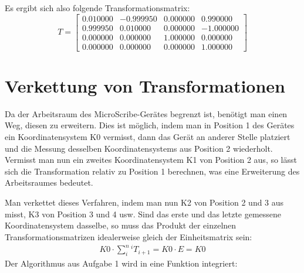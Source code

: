 \documentclass[11pt, a4paper]{article}
\begin{document}
Es ergibt sich also folgende Transformationsmatrix:
\begin{equation*}
T = \begin{bmatrix}
0.010000    &    -0.999950   &    0.000000    &    0.990000 \\
0.999950    &    0.010000    &    0.000000    &    -1.000000 \\
0.000000    &    0.000000    &    1.000000    &    0.000000 \\
0.000000    &    0.000000    &    0.000000    &    1.000000
\end{bmatrix}
\end{equation*}
\newpage
\section{Verkettung von Transformationen}
Da der Arbeitsraum des MicroScribe-Gerätes begrenzt ist, benötigt man einen Weg, diesen zu erweitern. Dies ist möglich, indem man in Position 1 des Gerätes ein Koordinatensystem K0 vermisst, dann das Gerät an anderer Stelle platziert und die Messung desselben Koordinatensystems aus Position 2 wiederholt. Vermisst man nun ein zweites Koordinatensystem K1 von Position 2 aus, so lässt sich die Transformation relativ zu Position 1 berechnen, was eine Erweiterung des Arbeitsraumes bedeutet.

Man verkettet dieses Verfahren, indem man nun K2 von Position 2 und 3 aus misst, K3 von Position 3 und 4 usw. Sind das erste und das letzte gemessene Koordinatensystem dasselbe, so muss das Produkt der einzelnen Transformationsmatrizen idealerweise gleich der Einheitsmatrix sein: 
\begin{eqnarray*}
K0 \cdot \sum_i^n{^iT_{i+1}} = K0 \cdot E = K0
\end{eqnarray*}
Der Algorithmus aus Aufgabe 1 wird in eine Funktion integriert:



\end{document}
